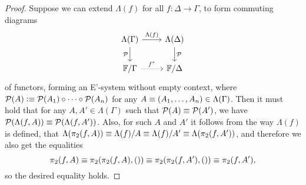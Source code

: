 \begin{proof}
Suppose we can extend $\Lambda(f)$ for all $f:\Delta\to\Gamma$, to form commuting
diagrams
\begin{equation*}
\begin{tikzcd}
\Lambda(\Gamma) \arrow[d,swap,"\mathcal{P}"] \arrow[r,"\Lambda(f)"] & \Lambda(\Delta) \arrow[d,"\mathcal{P}"] \\
\cat{F}/\Gamma \arrow[r,densely dotted,"{f^\ast}"] & \cat{F}/\Delta
\end{tikzcd}
\end{equation*}
of functors, forming an E'-system without empty context, where $\mathcal{P}(A)
\vcentcolon\equiv \mathcal{P}(A_1)\circ\cdots\circ\mathcal{P}(A_n)$ for any
$A\equiv (A_1,\ldots,A_n)\in\Lambda(\Gamma)$. Then it must hold that for any
$A,A'\in\Lambda(\Gamma)$ such that $\mathcal{P}(A)\equiv\mathcal{P}(A')$, we have
$\mathcal{P}(\Lambda(f,A))\equiv\mathcal{P}(\Lambda(f,A'))$. Also, for such
$A$ and $A'$ it follows from the way $\Lambda(f)$ is defined, 
that $\Lambda(\pi_2(f,A))\equiv \Lambda(f)/A\equiv
\Lambda(f)/A' \equiv \Lambda(\pi_2(f,A'))$, and therefore we also get the equalities
\begin{equation*}
\pi_2(f,A)\equiv \pi_2(\pi_2(f,A),())\equiv \pi_2(\pi_2(f,A'),()) \equiv \pi_2(f,A'),
\end{equation*}
so the desired equality holds.


\end{proof}

